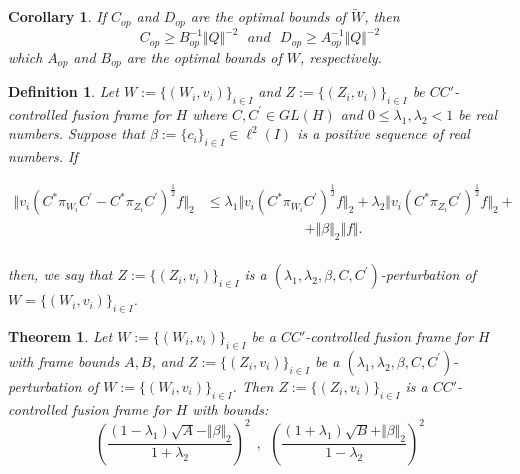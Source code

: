 \documentclass{mfatshort}
\newtheorem{theorem}{Theorem}[section]
\newtheorem{corollary}{Corollary}
\newtheorem{definition}{Definition}
\begin{document}
\begin{corollary}
If $C_{op}$ and $D_{op}$ are the optimal bounds of $\tilde{W}$, then
$$C_{op}\geq B_{op}^{-1}\Vert Q\Vert^{-2}\ \ \ and  \ \ \ D_{op}\geq A_{op}^{-1}\Vert Q\Vert^{-2}$$
which $A_{op}$ and $B_{op}$ are the optimal bounds of $W$, respectively.
\end{corollary}
\begin{definition}
Let   $W:=\lbrace(W_{i},v_{i})\rbrace _{i \in I}$ and  $Z:=\lbrace(Z_{i},v_{i})\rbrace _{i \in I}$ be  $CC'$-controlled fusion frame for $H$  where $C,C^{\prime} \in GL(H)$ and $0\leq \lambda_{1} , \lambda_{2}<1$ be real numbers. Suppose that  $\beta:=\lbrace c_i\rbrace_{i\in I}\in \ell^{2}(I)$ is a positive sequence of real numbers. If
\begin{small}
\begin{align*}
\Vert v_{i}(C^{*}\pi_{W_{i}} C^{\prime} -C^{*} \pi_{{Z}_{i}}C^{\prime})^{\frac{1}{2}}f \Vert_{2} &\leq \lambda _{1}\Vert v_{i}(C^{*}\pi_{W_{i}} C^{\prime})^{\frac{1}{2}}f \Vert_{2}+\lambda _{2}\Vert v_{i}(C^{*} \pi_{{Z}_{i}}C^{\prime})^{\frac{1}{2}}f \Vert_{2}+\\
 & \ \ \ \ \ \ \ \ \ \ \ \ \ \ \ \ \ \ \ \ \ \ \ \ \ \ \ \ \ \ \ \ +\Vert\beta\Vert_{2}\Vert f \Vert.\\
\end{align*}
\end{small}
then, we say that $Z:=\lbrace(Z_{i},v_{i})\rbrace _{i \in I}$ is a $(\lambda _{1} ,\lambda _{2},\beta ,C ,C^{\prime})$-perturbation  of  $W=\lbrace(W_{i},v_{i})\rbrace _{i \in I}$.
\end{definition}
\begin{theorem}
Let $W:=\lbrace(W_{i},v_{i})\rbrace _{i \in I}$ be a $CC'$-controlled fusion frame for $H$ with frame bounds $A,B$, and $Z:=\lbrace(Z_{i},v_{i})\rbrace _{i \in I}$ be a $(\lambda _{1} ,\lambda _{2},\beta ,C,C^{\prime})$-perturbation  of  $W:=\lbrace(W_{i},v_{i})\rbrace _{i \in I}$. Then $Z:=\lbrace(Z_{i},v_{i})\rbrace _{i \in I}$ is a $CC'$-controlled fusion frame for  $H$ with bounds:
$$(\dfrac{(1-\lambda_{1})\sqrt{A}-\Vert\beta\Vert_{2}}{1+\lambda _{2}})^{2} \ \ , \ \ (\dfrac{(1+\lambda_{1})\sqrt{B} +\Vert\beta\Vert_{2} }{1-\lambda_{2}})^{2} $$
\end{theorem}
\end{document}
